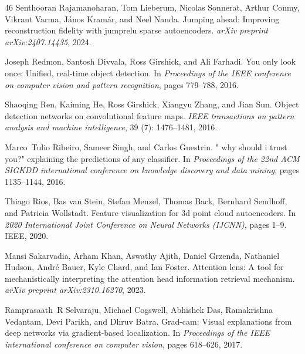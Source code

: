 \begin{thebibliography}{46}
Senthooran Rajamanoharan, Tom Lieberum, Nicolas Sonnerat, Arthur Conmy, Vikrant Varma, J{\'a}nos Kram{\'a}r, and Neel Nanda.
\newblock Jumping ahead: Improving reconstruction fidelity with jumprelu sparse autoencoders.
\newblock \emph{arXiv preprint arXiv:2407.14435}, 2024.

Joseph Redmon, Santosh Divvala, Ross Girshick, and Ali Farhadi.
\newblock You only look once: Unified, real-time object detection.
\newblock In \emph{Proceedings of the IEEE conference on computer vision and pattern recognition}, pages 779--788, 2016.

Shaoqing Ren, Kaiming He, Ross Girshick, Xiangyu Zhang, and Jian Sun.
\newblock Object detection networks on convolutional feature maps.
\newblock \emph{IEEE transactions on pattern analysis and machine intelligence}, 39 (7): 1476--1481, 2016.

Marco~Tulio Ribeiro, Sameer Singh, and Carlos Guestrin.
\newblock " why should i trust you?" explaining the predictions of any classifier.
\newblock In \emph{Proceedings of the 22nd ACM SIGKDD international conference on knowledge discovery and data mining}, pages 1135--1144, 2016.

Thiago Rios, Bas van Stein, Stefan Menzel, Thomas Back, Bernhard Sendhoff, and Patricia Wollstadt.
\newblock Feature visualization for 3d point cloud autoencoders.
\newblock In \emph{2020 International Joint Conference on Neural Networks (IJCNN)}, pages 1--9. IEEE, 2020.

Mansi Sakarvadia, Arham Khan, Aswathy Ajith, Daniel Grzenda, Nathaniel Hudson, Andr{\'e} Bauer, Kyle Chard, and Ian Foster.
\newblock Attention lens: A tool for mechanistically interpreting the attention head information retrieval mechanism.
\newblock \emph{arXiv preprint arXiv:2310.16270}, 2023.

Ramprasaath~R Selvaraju, Michael Cogswell, Abhishek Das, Ramakrishna Vedantam, Devi Parikh, and Dhruv Batra.
\newblock Grad-cam: Visual explanations from deep networks via gradient-based localization.
\newblock In \emph{Proceedings of the IEEE international conference on computer vision}, pages 618--626, 2017.


\end{thebibliography}
